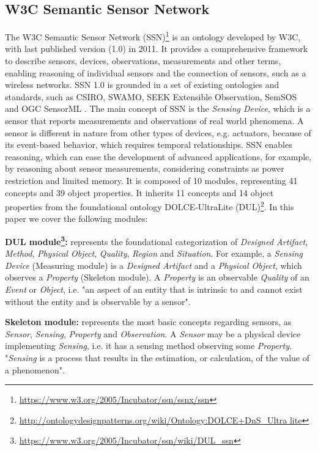 \documentclass{sig-alternate-05-2015}
\begin{document}
\subsection{W3C Semantic Sensor Network}
The W3C Semantic Sensor Network (SSN)\footnote{\url{https://www.w3.org/2005/Incubator/ssn/ssnx/ssn}} \cite{Compton2012} is an ontology developed by W3C, with last published version (1.0) in 2011. It provides a comprehensive framework to describe sensors, devices, observations, measurements and other terms, enabling reasoning of individual sensors and the connection of sensors, such as a wireless networks. SSN 1.0 is grounded in a set of existing ontologies and standards, such as CSIRO, SWAMO, SEEK Extensible Observation, SemSOS and OGC SensorML \cite{Ganzha2016a}. The main concept of SSN is the \textit{Sensing Device}, which is a sensor that reports measurements and observations of real world phenomena. A sensor is different in nature from other types of devices, e.g. actuators, because of its event-based behavior, which requires temporal relationships. SSN enables reasoning, which can ease the development of advanced applications, for example, by reasoning about sensor measurements, considering constraints as power restriction and limited memory. It is composed of 10 modules, representing 41 concepts and 39 object properties. It inherits 11 concepts and 14 object properties from the foundational ontology DOLCE-UltraLite (DUL)\footnote{\url{http://ontologydesignpatterns.org/wiki/Ontology:DOLCE+DnS\_Ultra lite}}. In this paper we cover the following modules:

\noindent
\textbf{DUL module\footnote{\url{https://www.w3.org/2005/Incubator/ssn/wiki/DUL_ssn}}:} represents the foundational categorization of \textit{Designed Artifact}, \textit{Method}, \textit{Physical Object}, \textit{Quality}, \textit{Region} and \textit{Situation}. For example, a \textit{Sensing Device} (Measuring module) is a \textit{Designed Artifact} and a \textit{Physical Object}, which observes a \textit{Property} (Skeleton module). A \textit{Property} is an observable \textit{Quality} of an \textit{Event} or \textit{Object}, i.e. "an aspect of an entity that is intrinsic to and cannot exist without the entity and is observable by a sensor". 

\noindent
\textbf{Skeleton module:} represents the most basic concepts regarding sensors, as \textit{Sensor}, \textit{Sensing}, \textit{Property} and  \textit{Observation}. A \textit{Sensor} may be a physical device implementing \textit{Sensing}, i.e. it has a sensing method observing some \textit{Property}. "\textit{Sensing} is a process that results in the estimation, or calculation, of the value of a phenomenon". 
\end{document}
